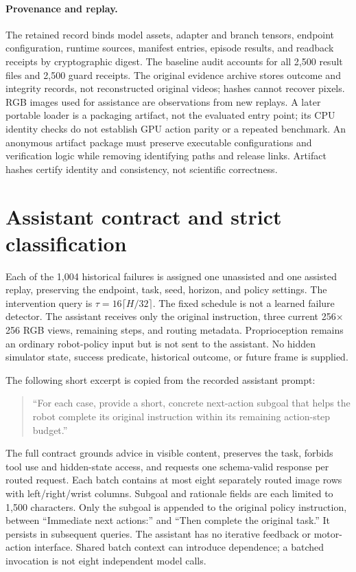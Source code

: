\paragraph{Provenance and replay.}
The retained record binds model assets, adapter and branch tensors, endpoint configuration, runtime sources, manifest entries, episode results, and readback receipts by cryptographic digest. The baseline audit accounts for all 2,500 result files and 2,500 guard receipts. The original evidence archive stores outcome and integrity records, not reconstructed original videos; hashes cannot recover pixels. RGB images used for assistance are observations from new replays. A later portable loader is a packaging artifact, not the evaluated entry point; its CPU identity checks do not establish GPU action parity or a repeated benchmark. An anonymous artifact package must preserve executable configurations and verification logic while removing identifying paths and release links. Artifact hashes certify identity and consistency, not scientific correctness.

\section{Assistant contract and strict classification}
\label{s:eligibility}
Each of the 1,004 historical failures is assigned one unassisted and one assisted replay, preserving the endpoint, task, seed, horizon, and policy settings. The intervention query is $\tau=16\lceil H/32\rceil$. The fixed schedule is not a learned failure detector. The assistant receives only the original instruction, three current 256$\times$256 RGB views, remaining steps, and routing metadata. Proprioception remains an ordinary robot-policy input but is not sent to the assistant. No hidden simulator state, success predicate, historical outcome, or future frame is supplied.

The following short excerpt is copied from the recorded assistant prompt:
\begin{quote}\small
``For each case, provide a short, concrete next-action subgoal that helps the robot complete its original instruction within its remaining action-step budget.''
\end{quote}
The full contract grounds advice in visible content, preserves the task, forbids tool use and hidden-state access, and requests one schema-valid response per routed request. Each batch contains at most eight separately routed image rows with left/right/wrist columns. Subgoal and rationale fields are each limited to 1,500 characters. Only the subgoal is appended to the original policy instruction, between ``Immediate next actions:'' and ``Then complete the original task.'' It persists in subsequent queries. The assistant has no iterative feedback or motor-action interface. Shared batch context can introduce dependence; a batched invocation is not eight independent model calls.

